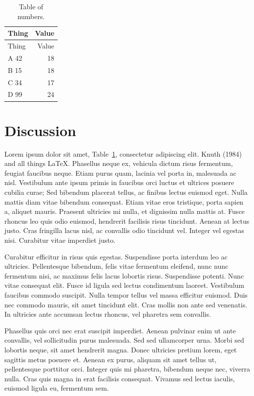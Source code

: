 \documentclass[
  oneside,
  open=any]{scrbook}
\begin{document}
\begin{longtable}[]{@{}lr@{}}
\caption{Table of numbers.}\label{tbl-numbers}\tabularnewline
\toprule\noalign{}
Thing & Value \\
\midrule\noalign{}
\endfirsthead
\toprule\noalign{}
Thing & Value \\
\midrule\noalign{}
\endhead
\bottomrule\noalign{}
\endlastfoot
A 42 & 18 \\
B 15 & 18 \\
C 34 & 17 \\
D 99 & 24 \\
\end{longtable}

\chapter{Discussion}\label{discussion}

Lorem ipsum dolor sit amet, Table~\ref{tbl-numbers}, consectetur
adipiscing elit. Knuth (1984) and all things LaTeX. Phasellus neque ex,
vehicula dictum risus fermentum, feugiat faucibus neque. Etiam purus
quam, lacinia vel porta in, malesuada ac nisl. Vestibulum ante ipsum
primis in faucibus orci luctus et ultrices posuere cubilia curae; Sed
bibendum placerat tellus, ac finibus lectus euismod eget. Nulla mattis
diam vitae bibendum consequat. Etiam vitae eros tristique, porta sapien
a, aliquet mauris. Praesent ultricies mi nulla, et dignissim nulla
mattis at. Fusce rhoncus leo quis odio euismod, hendrerit facilisis
risus tincidunt. Aenean at lectus justo. Cras fringilla lacus nisl, ac
convallis odio tincidunt vel. Integer vel egestas nisi. Curabitur vitae
imperdiet justo.

Curabitur efficitur in risus quis egestas. Suspendisse porta interdum
leo ac ultricies. Pellentesque bibendum, felis vitae fermentum eleifend,
nunc nunc fermentum nisi, ac maximus felis lacus lobortis risus.
Suspendisse potenti. Nunc vitae consequat elit. Fusce id ligula sed
lectus condimentum laoreet. Vestibulum faucibus commodo suscipit. Nulla
tempor tellus vel massa efficitur euismod. Duis nec commodo mauris, sit
amet tincidunt elit. Cras mollis non ante sed venenatis. In ultricies
ante accumsan lectus rhoncus, vel pharetra sem convallis.

Phasellus quis orci nec erat suscipit imperdiet. Aenean pulvinar enim ut
ante convallis, vel sollicitudin purus malesuada. Sed sed ullamcorper
urna. Morbi sed lobortis neque, sit amet hendrerit magna. Donec
ultricies pretium lorem, eget sagittis metus posuere et. Aenean ex
purus, aliquam sit amet tellus ut, pellentesque porttitor orci. Integer
quis mi pharetra, bibendum neque nec, viverra nulla. Cras quis magna in
erat facilisis consequat. Vivamus sed lectus iaculis, euismod ligula eu,
fermentum sem.
\end{document}
